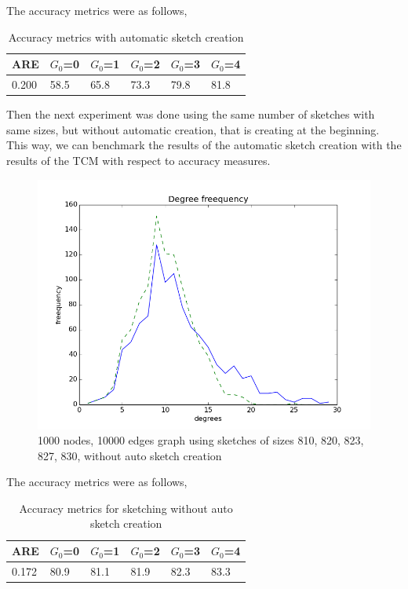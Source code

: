 \documentclass[12pt]{report}
\numberwithin{figure}{section}
\numberwithin{table}{section}
\begin{document}
The accuracy metrics were as follows, 

\begin{table}[H]
\centering
\begin{tabular}{|l|l|l|l|l|l|}
\hline
 ARE   & $G_0$=0 & $G_0$=1 & $G_0$=2 &  $G_0$=3 & $G_0$=4 \\ \hline
0.200 &   58.5  &  65.8   &   73.3  &   79.8   &   81.8 \\ \hline
\end{tabular}
\caption{Accuracy metrics with automatic sketch creation}
\end{table}

Then the next experiment was done using the same number of sketches with same sizes, but without automatic creation, that is creating at the beginning. This way, we can benchmark the results of the automatic sketch creation with the results of the TCM with respect to accuracy measures. 

\begin{figure}[H]
\centering
\includegraphics[scale=0.6]{images/MS-n1000-e10000-sketches-811-821-823-827-829plot}
\caption{1000 nodes, 10000 edges graph using sketches of sizes 810, 820, 823, 827, 830, without auto sketch creation}
\end{figure}

The accuracy metrics were as follows,

\begin{table}[H]
\centering
\begin{tabular}{|l|l|l|l|l|l|}
\hline
 ARE   & $G_0$=0 & $G_0$=1 & $G_0$=2 & $G_0$=3 & $G_0$=4\\ \hline
0.172 &   80.9  &   81.1  &   81.9  &   82.3  & 83.3   \\ \hline
\end{tabular}
\caption{Accuracy metrics for sketching without auto sketch creation}
\end{table}
\end{document}
